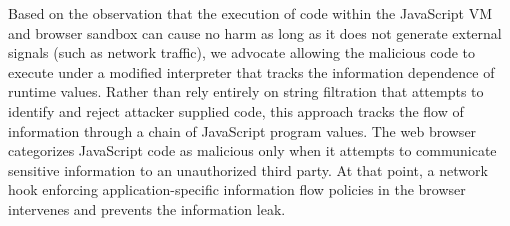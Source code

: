 Based on the observation that the execution of code within the JavaScript VM and browser sandbox can cause no harm as long as it does not generate external signals (such as network traffic), we advocate allowing the malicious code to execute under a modified interpreter that tracks the information dependence of runtime values.
Rather than rely entirely on string filtration that attempts to identify and reject attacker supplied code, this approach tracks the flow of information through a chain of JavaScript program values.
The web browser categorizes JavaScript code as malicious only when it attempts to communicate sensitive information to an unauthorized third party.
At that point, a network hook enforcing application-specific information flow policies in the browser intervenes and prevents the information leak.
